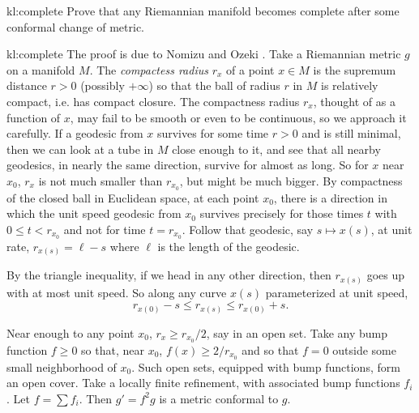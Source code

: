 \begin{problem}{kl:complete}
Prove that any Riemannian manifold becomes complete after some conformal change of metric.
\end{problem}
\begin{answer}{kl:complete}
The proof is due to Nomizu and Ozeki \cite{Nomizu/Ozeki:1961}.
Take a Riemannian metric \(g\) on a manifold \(M\).
The \emph{compactess radius} \(r_x\) of a point \(x \in M\) is the supremum distance \(r>0\) (possibly \(+\infty\)) so that the ball of radius \(r\) in \(M\) is relatively compact, i.e. has compact closure.
The compactness radius \(r_x\), thought of as a function of \(x\), may fail to be smooth or even to be continuous, so we approach it carefully.
If a geodesic from \(x\) survives for some time \(r>0\) and is still minimal, then we can look at a tube in \(M\) close enough to it, and see that all nearby geodesics, in nearly the same direction, survive for almost as long.
So for \(x\) near \(x_0\), \(r_x\) is not much smaller than \(r_{x_0}\), but might be much bigger.
By compactness of the closed ball in Euclidean space, at each point \(x_0\), there is a direction in which the unit speed geodesic from \(x_0\) survives precisely for those times \(t\) with \(0 \le t < r_{x_0}\) and not for time \(t=r_{x_0}\).
Follow that geodesic, say \(s \mapsto x(s)\), at unit rate, \(r_{x(s)}=\ell-s\) where \(\ell\) is the length of the geodesic.
\begin{center}
\end{center}

By the triangle inequality, if we head in any other direction, then \(r_{x(s)}\) goes up with at most unit speed.
So along any curve \(x(s)\) parameterized at unit speed,
\[
r_{x(0)}-s \le r_{x(s)} \le r_{x(0)}+s.
\]

Near enough to any point \(x_0\), \(r_x \ge r_{x_0}/2\), say in an open set.
Take any bump function \(f \ge 0\) so that, near \(x_0\), \(f(x) \ge 2/r_{x_0}\) and so that \(f=0\) outside some small neighborhood of \(x_0\).
Such open sets, equipped with bump functions, form an open cover.
Take a locally finite refinement, with associated bump functions \(f_i\).
Let \(f=\sum f_i\).
Then \(g' = f^2 g\) is a metric conformal to \(g\).


\end{answer}
